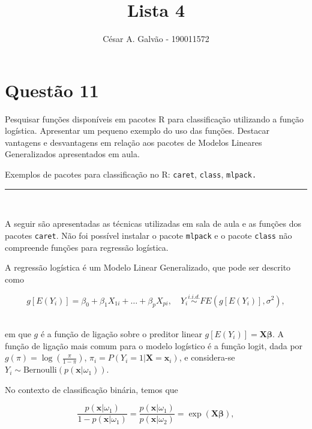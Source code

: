 \documentclass[
  a4paperpaper,
]{article}
\title{Lista 4}
\author{César A. Galvão - 190011572}
\date{}
\renewcommand*\contentsname{Índice}
\newcommand\contentsname{Índice}
\begin{document}
\maketitle

\renewcommand*\contentsname{Índice}
{
\hypersetup{linkcolor=}
\setcounter{tocdepth}{2}
\tableofcontents
}
\newpage{}

\section{Questão 11}\label{questuxe3o-11}

Pesquisar funções disponíveis em pacotes R para classificação utilizando
a função logística. Apresentar um pequeno exemplo do uso das funções.
Destacar vantagens e desvantagens em relação aos pacotes de Modelos
Lineares Generalizados apresentados em aula.

Exemplos de pacotes para classificação no R: \texttt{caret},
\texttt{class}, \texttt{mlpack.}

\begin{center}\rule{0.5\linewidth}{0.5pt}\end{center}

~

A seguir são apresentadas as técnicas utilizadas em sala de aula e as
funções dos pacotes \texttt{caret}. Não foi possível instalar o pacote
\texttt{mlpack} e o pacote \texttt{class} não compreende funções para
regressão logística.

A regressão logística é um Modelo Linear Generalizado, que pode ser
descrito como

\[
g\left[ E(Y_i) \right] = \beta_0 + \beta_1 X_{1i} + \ldots + \beta_p X_{pi}, \quad Y_i \overset{i.i.d.}{\sim} FE\left( g\left[ E(Y_i) \right], \sigma^2 \right),
\] ~

\noindent em que \(g\) é a função de ligação sobre o preditor linear
\(g\left[ E(Y_i) \right] = \mathbf{X}\boldsymbol{\beta}\). A função de
ligação mais comum para o modelo logístico é a função logit, dada por
\(g(\pi) = \log\left( \frac{\pi}{1-\pi} \right)\),
\(\pi_i = P(Y_i = 1 | \mathbf{X} = \mathbf{x}_i)\), e considera-se
\(Y_i \sim \text{Bernoulli}\left( p(\mathbf{x}|\omega_1) \right)\).

No contexto de classificação binária, temos que

\[
\frac{p(\mathbf{x}|\omega_1)}{1-p(\mathbf{x}|\omega_1)} = \frac{p(\mathbf{x}|\omega_1)}{p(\mathbf{x}|\omega_2)} = \exp\left( \mathbf{X}\boldsymbol{\beta} \right),
\] ~
\end{document}
